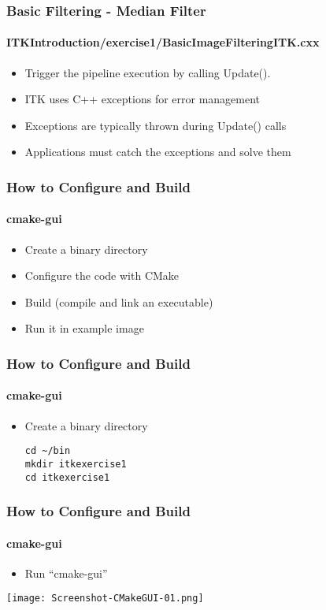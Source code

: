{
\begin{frame}[fragile]
\frametitle{Basic Filtering - Median Filter}
\framesubtitle{ITKIntroduction/exercise1/BasicImageFilteringITK.cxx}
\begin{itemize}
\item Trigger the pipeline execution by calling Update().
\end{itemize}
\pause
\begin{itemize}
\item ITK uses C++ exceptions for error management
\item Exceptions are typically thrown during Update() calls
\item Applications must catch the exceptions and solve them
\end{itemize}
\end{frame}
}

\begin{frame}
\frametitle{How to Configure and Build}
\framesubtitle{cmake-gui}
\begin{itemize}
\item Create a binary directory
\item Configure the code with CMake
\item Build (compile and link an executable)
\item Run it in example image
\end{itemize}
\end{frame}

\begin{frame}[fragile]
\frametitle{How to Configure and Build}
\framesubtitle{cmake-gui}
\begin{itemize}
\item Create a binary directory
\begin{verbatim}
cd ~/bin
mkdir itkexercise1
cd itkexercise1
\end{verbatim}
\end{itemize}
\end{frame}

\begin{frame}[fragile]
\frametitle{How to Configure and Build}
\framesubtitle{cmake-gui}
\begin{itemize}
\item Run ``cmake-gui''
\end{itemize}
\begin{center}
  \texttt{[image: Screenshot-CMakeGUI-01.png]}
\end{center}
\end{frame}

